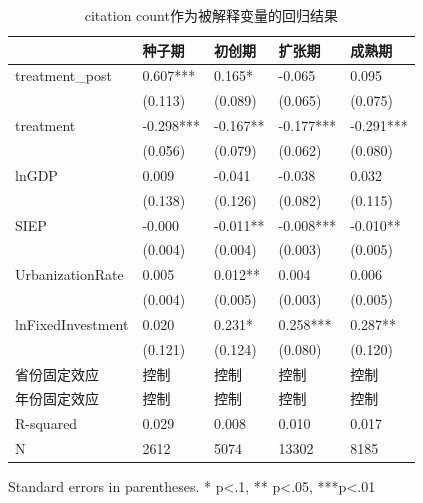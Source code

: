 \begin{table}
\caption{citation count作为被解释变量的回归结果}
\label{}
\begin{center}
\begin{tabular}{lllll}
\hline
                  & 种子期       & 初创期      & 扩张期       & 成熟期        \\
\hline
treatment\_post   & 0.607***  & 0.165*   & -0.065    & 0.095      \\
                  & (0.113)   & (0.089)  & (0.065)   & (0.075)    \\
treatment         & -0.298*** & -0.167** & -0.177*** & -0.291***  \\
                  & (0.056)   & (0.079)  & (0.062)   & (0.080)    \\
lnGDP             & 0.009     & -0.041   & -0.038    & 0.032      \\
                  & (0.138)   & (0.126)  & (0.082)   & (0.115)    \\
SIEP            & -0.000    & -0.011** & -0.008*** & -0.010**   \\
                  & (0.004)   & (0.004)  & (0.003)   & (0.005)    \\
UrbanizationRate              & 0.005     & 0.012**  & 0.004     & 0.006      \\
                  & (0.004)   & (0.005)  & (0.003)   & (0.005)    \\
lnFixedInvestment & 0.020     & 0.231*   & 0.258***  & 0.287**    \\
                  & (0.121)   & (0.124)  & (0.080)   & (0.120)    \\
省份固定效应  & 控制 & 控制 & 控制 & 控制  \\ 
 年份固定效应  & 控制 & 控制 & 控制 & 控制  \\ 
\hline

R-squared         & 0.029     & 0.008    & 0.010     & 0.017      \\
N                 & 2612      & 5074     & 13302     & 8185       \\
\hline
\end{tabular}
\end{center}
\end{table}
\bigskip
Standard errors in parentheses. \newline 
* p<.1, ** p<.05, ***p<.01


